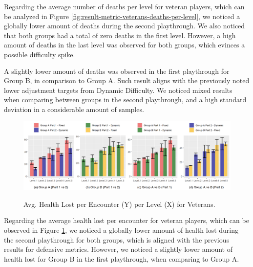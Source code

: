 Regarding the average number of deaths per level for veteran players, which can be analyzed in Figure \ref{fig:result-metric-veterans-deaths-per-level}, we noticed a globally lower amount of deaths during the second playthrough. We also noticed that both groups had a total of zero deaths in the first level. However, a high amount of deaths in the last level was observed for both groups, which evinces a possible difficulty spike.

A slightly lower amount of deaths was observed in the first playthrough for Group B, in comparison to Group A. Such result aligns with the previously noted lower adjustment targets from Dynamic Difficulty. We noticed mixed results when comparing between groups in the second playthrough, and a high standard deviation in a considerable amount of samples.

\begin{figure}[!ht]
    \begin{center}
    \caption{Avg. Health Lost per Encounter (Y) per Level (X) for Veterans.}
        \includegraphics[width=\textwidth]{figures/health_lost_per_encounter-veteran_players.png}
        \label{fig:result-metric-veterans-health-lost-per-encounter}
    \end{center}
\end{figure}

Regarding the average health lost per encounter for veteran players, which can be observed in Figure \ref{fig:result-metric-veterans-health-lost-per-encounter}, we noticed a globally lower amount of health lost during the second playthrough for both groups, which is aligned with the previous results for defensive metrics. However, we noticed a slightly lower amount of health lost for Group B in the first playthrough, when comparing to Group A.

